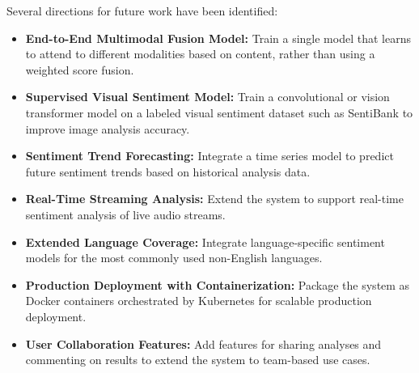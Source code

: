 \documentclass[12pt, a4paper]{report}
\begin{document}
Several directions for future work have been identified:

\begin{itemize}[noitemsep, leftmargin=1.5em]
    \item \textbf{End-to-End Multimodal Fusion Model:} Train a single model that learns to attend to different modalities based on content, rather than using a weighted score fusion.
    \item \textbf{Supervised Visual Sentiment Model:} Train a convolutional or vision transformer model on a labeled visual sentiment dataset such as SentiBank to improve image analysis accuracy.
    \item \textbf{Sentiment Trend Forecasting:} Integrate a time series model to predict future sentiment trends based on historical analysis data.
    \item \textbf{Real-Time Streaming Analysis:} Extend the system to support real-time sentiment analysis of live audio streams.
    \item \textbf{Extended Language Coverage:} Integrate language-specific sentiment models for the most commonly used non-English languages.
    \item \textbf{Production Deployment with Containerization:} Package the system as Docker containers orchestrated by Kubernetes for scalable production deployment.
    \item \textbf{User Collaboration Features:} Add features for sharing analyses and commenting on results to extend the system to team-based use cases.
\end{itemize}
\end{document}
